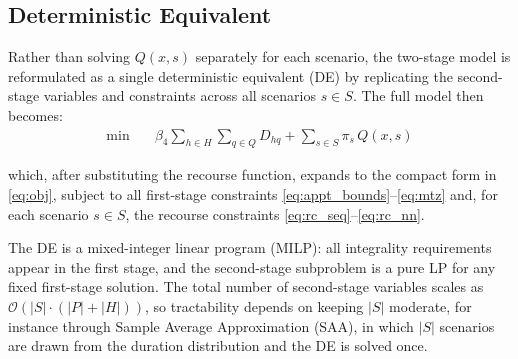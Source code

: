 \subsection{Deterministic Equivalent}
 
Rather than solving $Q(x,s)$ separately for each scenario, the two-stage
model is reformulated as a single deterministic equivalent (DE) by replicating
the second-stage variables and constraints across all scenarios $s \in S$. The
full model then becomes:
%
\begin{align}
  \min \quad
    & \beta_4 \sum_{h \in H} \sum_{q \in Q} D_{hq}
    + \sum_{s \in S} \pi_s \, Q(x, s)
  \label{eq:de_obj}
\end{align}
 
\noindent which, after substituting the recourse function, expands to the
compact form in \eqref{eq:obj}, subject to all first-stage constraints
\eqref{eq:appt_bounds}--\eqref{eq:mtz} and, for each scenario $s \in S$,
the recourse constraints \eqref{eq:rc_seq}--\eqref{eq:rc_nn}.
 
The DE is a mixed-integer linear program (MILP): all integrality requirements
appear in the first stage, and the second-stage subproblem is a pure LP for
any fixed first-stage solution. The total number of second-stage variables
scales as $\mathcal{O}(|S| \cdot (|P| + |H|))$, so tractability depends on
keeping $|S|$ moderate, for instance through Sample Average Approximation
(SAA), in which $|S|$ scenarios are drawn from the duration distribution and
the DE is solved once.
